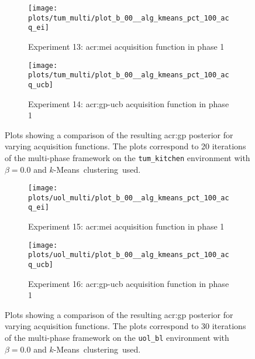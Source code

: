 \begin{figure}[!t]
	\centering
	\captionsetup{font=small}
	\captionsetup[subfigure]{font=footnotesize}
	\captionsetup[subfigure]{justification=centering}
	\begin{subfigure}[t]{0.495\textwidth}
		\texttt{[image: plots/tum\_multi/plot\_b\_00\_\_alg\_kmeans\_pct\_100\_acq\_ei]}
		\caption{Experiment 13: \acrshort{acr:mei} acquisition function in phase 1}
		\label{fig:exp13}
	\end{subfigure}
	\begin{subfigure}[t]{0.495\textwidth}
		\texttt{[image: plots/tum\_multi/plot\_b\_00\_\_alg\_kmeans\_pct\_100\_acq\_ucb]}
		\caption{Experiment 14: \acrshort{acr:gp-ucb} acquisition function in phase 1}
		\label{fig:exp14}
	\end{subfigure}
	\caption{Plots showing a comparison of the resulting \acrshort{acr:gp} posterior for varying acquisition functions. The plots correspond to 20 iterations of the multi-phase framework on the \texttt{tum\_kitchen} environment with $\beta = 0.0$ and $k$-Means~clustering~used.}
	\label{fig:plots_tum_multi_acq}
	
	\null
	\begin{subfigure}[t]{0.495\textwidth}
		\texttt{[image: plots/uol\_multi/plot\_b\_00\_\_alg\_kmeans\_pct\_100\_acq\_ei]}
		\caption{Experiment 15: \acrshort{acr:mei} acquisition function in phase 1}
		\label{fig:exp15}
	\end{subfigure}
	\begin{subfigure}[t]{0.495\textwidth}
		\texttt{[image: plots/uol\_multi/plot\_b\_00\_\_alg\_kmeans\_pct\_100\_acq\_ucb]}
		\caption{Experiment 16: \acrshort{acr:gp-ucb} acquisition function in phase 1}
		\label{fig:exp16}
	\end{subfigure}
	\caption{Plots showing a comparison of the resulting \acrshort{acr:gp} posterior for varying acquisition functions. The plots correspond to 30 iterations of the multi-phase framework on the \texttt{uol\_bl} environment with $\beta = 0.0$ and $k$-Means~clustering~used.}
	\label{fig:plots_uol_multi_acq}
\end{figure}


